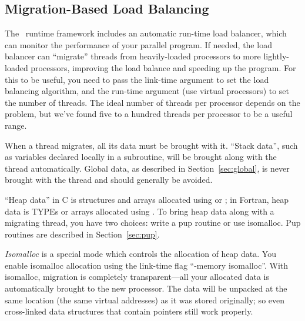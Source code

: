 \documentclass[10pt]{article}
\begin{document}
\subsection{Migration-Based Load Balancing}
\label{sec:migration}
\label{sec:isomalloc}

The \charmpp\ runtime framework includes an automatic run-time load balancer,
which can monitor the performance of your parallel program.
If needed, the load balancer can ``migrate'' threads from heavily-loaded
processors to more lightly-loaded processors, improving the load balance and
speeding up the program.  For this to be useful, you need to pass the 
link-time argument   to set the load balancing algorithm,
and the run-time argument   (use  virtual processors)
to set the number of threads.
The ideal number of threads per processor depends on the problem, but
we've found five to a hundred threads per processor to be a useful range.

When a thread migrates, all its data must be brought with it.
``Stack data'', such as variables declared locally in a subroutine,
will be brought along with the thread automatically.  Global data,
as described in Section~\ref{sec:global}, is never brought with the thread
and should generally be avoided.

``Heap data'' in C is structures and arrays allocated using  or ;
in Fortran, heap data is TYPEs or arrays allocated using .
To bring heap data along with a migrating thread, you have two choices:
write a pup routine or use isomalloc.  Pup routines are described in 
Section~\ref{sec:pup}.

{\em Isomalloc} is a special mode which controls the allocation of heap data.  
You enable isomalloc allocation using the link-time flag ``-memory isomalloc''.  
With isomalloc, migration is completely transparent---all your allocated data 
is automatically brought to the new processor.  The data will be unpacked at the same
location (the same virtual addresses) as it was stored originally; so even
cross-linked data structures that contain pointers still work properly.
\end{document}
